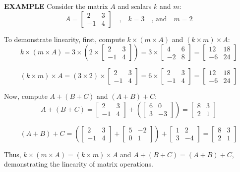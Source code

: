 \documentclass{report}
\begin{document}
\begin{tcolorbox}[colback=gray!10, boxrule=0pt]
\textbf{EXAMPLE}
Consider the matrix \( A \) and scalars \( k \) and \( m \):
\[
A = \begin{bmatrix}
2 & 3 \\
-1 & 4
\end{bmatrix}
\quad \text{,} \quad
k = 3
\quad \text{, and} \quad
m = 2
\]

To demonstrate linearity, first, compute \( k \times (m \times A) \) and \( (k \times m) \times A \):
\[
k \times (m \times A) = 
3 \times (2 \times 
\begin{bmatrix}
2 & 3 \\
-1 & 4
\end{bmatrix})
=
3 \times 
\begin{bmatrix}
4 & 6 \\
-2 & 8
\end{bmatrix}
=
\begin{bmatrix}
12 & 18 \\
-6 & 24
\end{bmatrix}
\]

\[
(k \times m) \times A = 
(3 \times 2) \times 
\begin{bmatrix}
2 & 3 \\
-1 & 4
\end{bmatrix}
=
6 \times 
\begin{bmatrix}
2 & 3 \\
-1 & 4
\end{bmatrix}
=
\begin{bmatrix}
12 & 18 \\
-6 & 24
\end{bmatrix}
\]

Now, compute \( A + (B + C) \) and \( (A + B) + C \):
\[
A + (B + C) = 
\begin{bmatrix}
2 & 3 \\
-1 & 4
\end{bmatrix}
+ 
\left(
\begin{bmatrix}
6 & 0 \\
3 & -3
\end{bmatrix}
\right)
=
\begin{bmatrix}
8 & 3 \\
2 & 1
\end{bmatrix}
\]

\[
(A + B) + C = 
\left(
\begin{bmatrix}
2 & 3 \\
-1 & 4
\end{bmatrix}
+ 
\begin{bmatrix}
5 & -2 \\
0 & 1
\end{bmatrix}
\right)
+ 
\begin{bmatrix}
1 & 2 \\
3 & -4
\end{bmatrix}
=
\begin{bmatrix}
8 & 3 \\
2 & 1
\end{bmatrix}
\]

Thus, \( k \times (m \times A) = (k \times m) \times A \) and \( A + (B + C) = (A + B) + C \), demonstrating the linearity of matrix operations.
\end{tcolorbox}
\end{document}
